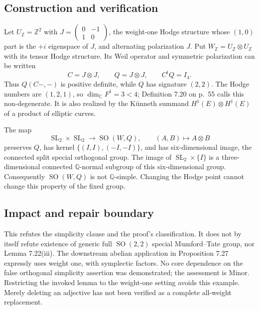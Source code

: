 \documentclass[10pt]{article}
\begin{document}
\subsection*{Construction and verification}
Let \(U_\mathbb Z=\mathbb Z^2\) with \(J=\left(\begin{smallmatrix}0&-1\\1&0\end{smallmatrix}\right)\), the weight-one Hodge structure whose \((1,0)\) part is the \(+i\) eigenspace of \(J\), and alternating polarization \(J\). Put \(W_\mathbb Z=U_\mathbb Z\otimes U_\mathbb Z\) with its tensor Hodge structure. Its Weil operator and symmetric polarization can be written \[C=J\otimes J,\qquad Q=J\otimes J,\qquad C^tQ=I_4.\] Thus \(Q(C-, -)\) is positive definite, while \(Q\) has signature \((2,2)\). The Hodge numbers are \((1,2,1)\), so \(\dim_\mathbb CF^1=3<4\); Definition 7.20 on p. 55 calls this non-degenerate. It is also realized by the Künneth summand \(H^1(E)\otimes H^1(E)\) of a product of elliptic curves.\par
The map \[\operatorname{SL}_2\times\operatorname{SL}_2\longrightarrow\operatorname{SO}(W,Q),\qquad
 (A,B)\longmapsto A\otimes B\] preserves \(Q\), has kernel \(\{(I,I),(-I,-I)\}\), and has six-dimensional image, the connected split special orthogonal group. The image of \(\operatorname{SL}_2\times\{I\}\) is a three-dimensional connected \(\mathbb Q\)-normal subgroup of this six-dimensional group. Consequently \(\operatorname{SO}(W,Q)\) is not \(\mathbb Q\)-simple. Changing the Hodge point cannot change this property of the fixed group.\par
\subsection*{Impact and repair boundary}
This refutes the simplicity clause and the proof’s classification. It does not by itself refute existence of generic full \(\operatorname{SO}(2,2)\) special Mumford–Tate group, nor Lemma 7.22(iii). The downstream abelian application in Proposition 7.27 expressly uses weight one, with symplectic factors. No core dependence on the false orthogonal simplicity assertion was demonstrated; the assessment is Minor. Restricting the invoked lemma to the weight-one setting avoids this example. Merely deleting an adjective has not been verified as a complete all-weight replacement.\par
\end{document}
